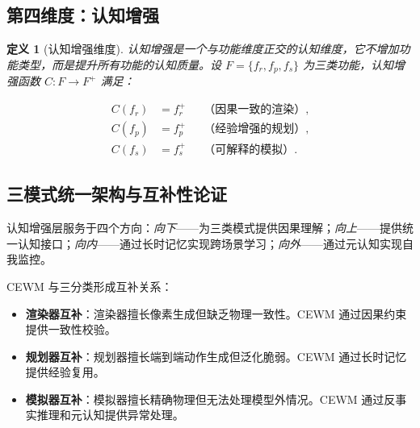 \documentclass[11pt,a4paper]{article}
\newtheorem{definition}{定义}[section]
\newcommand{\CEWM}{\textsc{CEWM}}
\begin{document}
\subsection{第四维度：认知增强}

\begin{definition}[认知增强维度]\label{def:ce-dim}
认知增强是一个与功能维度正交的认知维度，它不增加功能类型，而是提升所有功能的认知质量。设 $F = \{f_r, f_p, f_s\}$ 为三类功能，认知增强函数 $C: F \to F^+$ 满足：
\end{definition}

\begin{equation}\label{eq:ce-func}
\begin{aligned}
  C(f_r) &= f_r^+ && \text{（因果一致的渲染）}, \\
  C(f_p) &= f_p^+ && \text{（经验增强的规划）}, \\
  C(f_s) &= f_s^+ && \text{（可解释的模拟）}.
\end{aligned}
\end{equation}

\subsection{三模式统一架构与互补性论证}

认知增强层服务于四个方向：\emph{向下}——为三类模式提供因果理解；\emph{向上}——提供统一认知接口；\emph{向内}——通过长时记忆实现跨场景学习；\emph{向外}——通过元认知实现自我监控。

\CEWM{} 与三分类形成互补关系：
\begin{itemize}[nosep]
  \item \textbf{渲染器互补}：渲染器擅长像素生成但缺乏物理一致性。\CEWM{} 通过因果约束提供一致性校验。
  \item \textbf{规划器互补}：规划器擅长端到端动作生成但泛化脆弱。\CEWM{} 通过长时记忆提供经验复用。
  \item \textbf{模拟器互补}：模拟器擅长精确物理但无法处理模型外情况。\CEWM{} 通过反事实推理和元认知提供异常处理。
\end{itemize}
\end{document}

